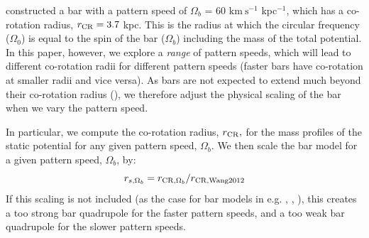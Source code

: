 \documentclass[twocolumn]{aastex62}
\newcommand{\msun}{\textrm{M}_\odot}
\newcommand{\kms}{\ensuremath{\textrm{km}~\textrm{s}^{-1}}}
\newcommand{\todo}[1]{{\color{red} TODO: #1}}
\begin{document}
\citet{wang:2012} constructed a bar with a pattern speed of $\Omega_b$ =  60 $\kms$ kpc$^{-1}$, which has a co-rotation radius, $r_{\rm CR} = 3.7$ kpc.
This is the radius at which the circular frequency ($\Omega_0$) is equal to the spin of the bar ($\Omega_b$) including the mass of the total potential.
In this paper, however, we explore a {\it range} of pattern speeds, which will lead to different co-rotation radii for different pattern speeds (faster bars have co-rotation at smaller radii and vice versa).
As bars are not expected to extend much beyond their co-rotation radius (\citealt{binney:2008}), we therefore adjust the physical scaling of the bar when we vary the pattern speed. %

In particular, we  compute the co-rotation radius, $r_{\rm CR},$ for the mass profiles of the static potential for any given pattern speed, $\Omega_b$.
We then scale the bar model for a given pattern speed, $\Omega_b$, by:
\begin{equation} 
r_{s, \Omega_b}  = r_{{\rm CR}, \Omega_b}/r_{{\rm CR, Wang 2012}}
\end{equation} 
If this scaling is not included (as the case for bar models in e.g. %
\citealt{Pearson:2017}, \citealt{Erkal:2017}, \citealt{Banik:2019}), this creates a too strong bar quadrupole for the faster pattern speeds, and a too weak bar quadrupole for the slower pattern speeds. 

% 
\end{document}
